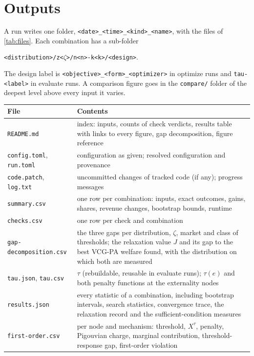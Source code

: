 \documentclass[11pt]{article}
\newcommand{\code}[1]{\texttt{#1}}
\begin{document}
\section{Outputs}\label{sec:outputs}

A run writes one folder, \code{<date>\_<time>\_<kind>\_<name>}, with the files of \cref{tab:files}. Each combination has a sub-folder
\begin{center}
\code{<distribution>/z<$\zeta$>/n<n>-k<k>/<design>}.
\end{center}
The design label is \code{<objective>\_<form>\_<optimizer>} in optimize runs and \code{tau-<label>} in evaluate runs. A comparison figure goes in the \code{compare/} folder of the deepest level above every input it varies.

\begin{table}[ht]
\centering\small
\begin{tabularx}{\linewidth}{@{}l L@{}}
\toprule
File & Contents \\
\midrule
\code{README.md} & index: inputs, counts of check verdicts, results table with links to every figure, gap decomposition, figure reference \\
\code{config.toml}, \code{run.toml} & configuration as given; resolved configuration and provenance \\
\code{code.patch}, \code{log.txt} & uncommitted changes of tracked code (if any); progress messages \\
\code{summary.csv} & one row per combination: inputs, exact outcomes, gains, shares, revenue changes, bootstrap bounds, runtime \\
\code{checks.csv} & one row per check and combination \\
\code{gap-decomposition.csv} & the three gaps per distribution, $\zeta$, market and class of thresholds; the relaxation value $J$ and its gap to the best VCG-PA welfare found, with the distribution on which both are measured \\
\code{tau.json}, \code{tau.csv} & $\tau$ (rebuildable, reusable in evaluate runs); $\tau(e)$ and both penalty functions at the externality nodes \\
\code{results.json} & every statistic of a combination, including bootstrap intervals, search statistics, convergence trace, the relaxation record and the sufficient-condition measures \\
\code{first-order.csv} & per node and mechanism: threshold, $X^\tau$, penalty, Pigouvian charge, marginal contribution, threshold-response gap, first-order violation \\

\end{tabularx}
\end{table}
\end{document}
